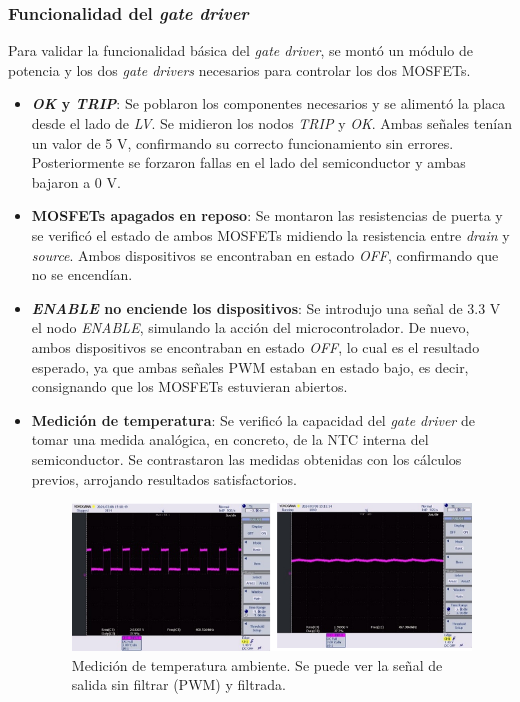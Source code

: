 \subsubsection{Funcionalidad del \textit{gate driver}}
Para validar la funcionalidad básica del \textit{gate driver}, se montó un módulo de potencia y los dos \textit{gate drivers} necesarios para controlar los dos MOSFETs.

\begin{itemize}
	\item \textbf{\textit{OK} y \textit{TRIP}}: Se poblaron los componentes necesarios y se alimentó la placa desde el lado de \textit{LV}. Se midieron los nodos \textit{TRIP} y \textit{OK}. Ambas señales tenían un valor de 5 V, confirmando su correcto funcionamiento sin errores. Posteriormente se forzaron fallas en el lado del semiconductor y ambas bajaron a 0 V.
	\item \textbf{MOSFETs apagados en reposo}: Se montaron las resistencias de puerta y se verificó el estado de ambos MOSFETs midiendo la resistencia entre \textit{drain} y \textit{source}. Ambos dispositivos se encontraban en estado \textit{OFF}, confirmando que no se encendían.
	\item \textbf{\textit{ENABLE} no enciende los dispositivos}: Se introdujo una señal de 3.3 V el nodo \textit{ENABLE}, simulando la acción del microcontrolador. De nuevo, ambos dispositivos se encontraban en estado \textit{OFF}, lo cual es el resultado esperado, ya que ambas señales PWM estaban en estado bajo, es decir, consignando que los MOSFETs estuvieran abiertos.
	\item \textbf{Medición de temperatura}: Se verificó la capacidad del \textit{gate driver} de tomar una medida analógica, en concreto, de la NTC interna del semiconductor. Se contrastaron las medidas obtenidas con los cálculos previos, arrojando resultados satisfactorios.
	
	\begin{figure}[H]
		\centering
		\includegraphics[width=0.7\linewidth]{fig/NTC-driver}
		\caption{Medición de temperatura ambiente. Se puede ver la señal de salida sin filtrar (PWM) y filtrada.}
	\end{figure}
	
\end{itemize}
	
